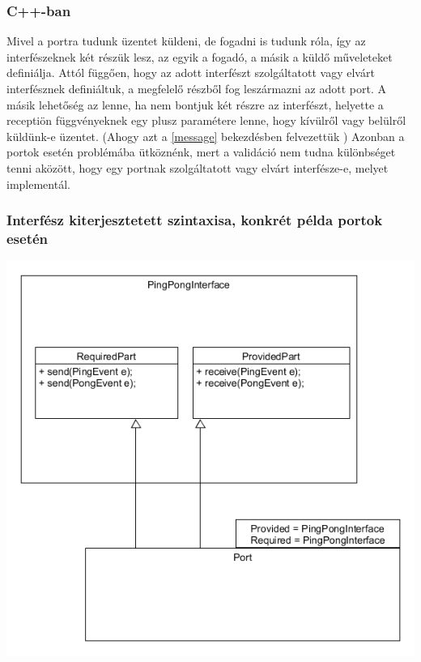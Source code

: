 \documentclass[a4paper,12pt]{report}
\begin{document}
\subsubsection{C++-ban}
Mivel a portra tudunk üzentet küldeni, de fogadni is tudunk róla, így az interfészeknek két részük lesz, az egyik a fogadó, a másik a küldő műveleteket definiálja. Attól függően, hogy az adott interfészt szolgáltatott vagy elvárt interfésznek definiáltuk, a megfelelő részből fog leszármazni az adott port. A másik lehetőség az lenne, ha nem bontjuk két részre az interfészt, helyette a receptiön függvényeknek egy plusz paramétere lenne, hogy kívülről vagy belülről küldünk-e üzentet. (Ahogy azt a \ref{message} bekezdésben felvezettük ) Azonban a portok esetén problémába ütköznénk, mert a validáció nem tudna különbséget tenni aközött, hogy egy portnak szolgáltatott vagy elvárt interfésze-e, melyet implementál. \\

\subsubsection{Interfész kiterjesztetett szintaxisa, konkrét példa portok esetén}
\includegraphics[scale=0.7]{seperate_inf.png} \\
\end{document}

